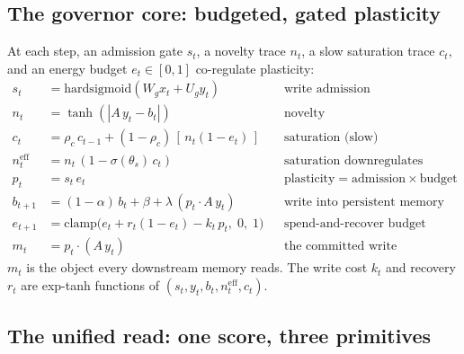\documentclass[11pt]{article}
\begin{document}
\subsection{The governor core: budgeted, gated plasticity}
\label{sec:governor}

At each step, an admission gate $s_t$, a novelty trace $n_t$, a slow
saturation trace $c_t$, and an energy budget $e_t \in [0,1]$ co-regulate
plasticity:
\begin{align}
s_t &= \mathrm{hardsigmoid}(W_g x_t + U_g y_t) && \text{write admission} \nonumber\\
n_t &= \tanh(|A\,y_t - b_t|) && \text{novelty} \nonumber\\
c_t &= \rho_c\, c_{t-1} + (1-\rho_c)\,[\,n_t (1 - e_t)\,] && \text{saturation (slow)} \nonumber\\
n_t^{\mathrm{eff}} &= n_t \,(1 - \sigma(\theta_s)\, c_t) && \text{saturation downregulates novelty} \nonumber\\
p_t &= s_t \, e_t && \text{plasticity} = \text{admission} \times \text{budget} \nonumber\\
b_{t+1} &= (1-\alpha)\, b_t + \beta + \lambda\,(p_t \cdot A\,y_t) && \text{write into persistent memory} \nonumber\\
e_{t+1} &= \mathrm{clamp}\big(e_t + r_t (1 - e_t) - k_t\, p_t,\; 0,\; 1\big) && \text{spend-and-recover budget} \nonumber\\
m_t &= p_t \cdot (A\,y_t) && \text{the committed write}
\end{align}
$m_t$ is the object every downstream memory reads. The write cost $k_t$ and
recovery $r_t$ are exp-tanh functions of $(s_t, y_t, b_t, n_t^{\mathrm{eff}},
c_t)$.

\subsection{The unified read: one score, three primitives}
\label{sec:read}
\end{document}
